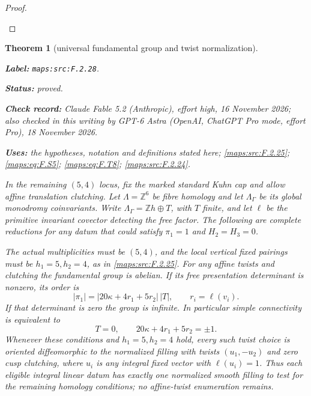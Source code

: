 \documentclass[11pt,a4paper]{article}
\newtheorem{theorem}{Theorem}[section]
\theoremstyle{definition}
\newcommand{\StatementRecord}[4]{\par\smallskip\begingroup\upshape\raggedright\noindent\textbf{Label:} \nolinkurl{#1}.\par\noindent\textbf{Status:} #2.\par\noindent\textbf{Check record:} #3.\par\noindent\textbf{Uses:} #4.\par\endgroup\smallskip}
\newcommand{\CurrentChecker}{GPT-6 Astra (OpenAI, ChatGPT Pro mode, effort Pro), 18 November 2026}
\begin{document}
\begin{proof}
\begin{enumerate}[label=\arabic*.]
\end{enumerate}
\end{proof}




\begin{theorem}[universal fundamental group and twist normalization]\label{maps:src:F.2.28}
\StatementRecord{maps:src:F.2.28}{proved}{Claude Fable 5.2 (Anthropic), effort high, 16 November 2026; also checked in this writing by \CurrentChecker}{the hypotheses, notation and definitions stated here; \cref{maps:src:F.2.25}; \cref{maps:eq:F.S5}; \cref{maps:eq:F.T8}; \cref{maps:src:F.2.24}}


In the remaining $(5,4)$ locus, fix the marked standard Kuhn
cap and allow affine translation clutching.
Let $\Lambda=\mathbb Z^6$ be fibre homology and let
$\Lambda_\Gamma$ be its global monodromy coinvariants.
Write $\Lambda_\Gamma=\mathbb Zh\oplus T$, with $T$ finite,
and let $\ell$ be the primitive invariant covector detecting
the free factor.  The following are complete reductions for
any datum that could satisfy $\pi_1=1$ and $H_2=H_3=0$.

The actual multiplicities must be $(5,4)$, and the local
vertical fixed pairings must be $h_1=5,h_2=4$, as in \ref{maps:src:F.2.25}.
For any affine twists and clutching the fundamental group
is abelian.  If its free presentation determinant is nonzero,
its order is
\[
 |\pi_1|=|20\kappa+4r_1+5r_2|\,|T|,
 \qquad r_i=\ell(v_i).
 \tag{F.T11}\label{maps:eq:F.T11}
\]
If that determinant is zero the group is infinite.
In particular simple connectivity is equivalent to
\[
 T=0,\qquad 20\kappa+4r_1+5r_2=\pm1.
 \tag{F.T12}\label{maps:eq:F.T12}
\]
Whenever these conditions and $h_1=5,h_2=4$ hold, every
such twist choice is oriented diffeomorphic to the normalized
filling with twists $(u_1,-u_2)$ and zero cusp clutching,
where $u_i$ is any integral fixed vector with $\ell(u_i)=1$.
Thus each eligible integral linear datum has exactly one
normalized smooth filling to test for the remaining
homology conditions; no affine-twist enumeration remains.

\end{theorem}
\end{document}

